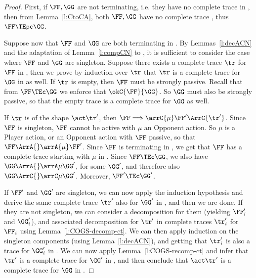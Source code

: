 \begin{proof}
First, if $\FF,\GG$ are not terminating, i.e. they have no complete trace in \AOGS, 
then from Lemma~\ref{l:CtoCA}, both 
$\FF,\GG$ have no complete trace \COGS, thus
$\FF \TEpc \GG$. 

Suppose now that $\FF$ and $\GG$ are both terminating in \AOGS.
By Lemmas~\ref{l:decACN} and the adaptation of Lemma~\ref{l:compCN} to \COGS, it is sufficient to consider 
the case where $\FF$ and $\GG$ are singleton. 
%
Suppose there exists a complete trace $\tr$ for $\FF$ in \COGS, 
then we prove by induction over $\tr$
that $\tr$ is a complete trace for $\GG$ in \COGS as well.
If $\tr$ is empty, then $\FF$ must be strongly passive.
Recall that from $\FF \TEc \GG$ we enforce that
$\okC{\FF}{\GG}$.
So $\GG$ must also be strongly passive, so that 
the empty trace is a complete trace for $\GG$ as well.


If $\tr$ is of the shape $\act\tr'$, then
$\FF \Longrightarrow \arrC {\mu} \FF' \ArrC{\tr'}$.
Since $\FF$ is singleton, $\FF$ cannot be active with $\mu$ an Opponent action.
So $\mu$ is a Player action, or an Opponent action with $\FF$ passive,
so that $\FF \ArrA{}  \arrA {\mu} \FF'$.
Since $\FF$ is terminating in \AOGS, we get that $\FF$ has a complete trace
starting with $\mu$ in \AOGS.
Since 
$\FF  \TEc \GG$, we also have
$\GG \ArrA{} \arrA \mu \GG'$, for some $\GG'$, and therefore also 
$\GG \ArrC{} \arrC \mu \GG'$. 
Moreover, $\FF' \TEc \GG'$.

If $\FF'$ and $\GG'$ are singleton, we can now apply the induction hypothesis 
and derive the same complete trace  $\tr'$ also for $\GG'$ in \COGS, and then we are done. 
%
If they are not singleton, we can consider a decomposition for them 
(yielding $\FF'_i$ and $\GG'_i$), and associated decomposition
for $\tr'$ in complete traces $\tr'_i$ for $\FF_i$ using Lemma~\ref{l:COGS-decomp-ct}. 
We can then apply induction on the singleton components (using
Lemma~\ref{l:decACN}), and getting that
$\tr'_i$ is also a trace for $\GG_i'$ in \COGS. 
We can now apply Lemma~\ref{l:COGS-recomp-ct} 
and infer that $\tr'$ is a complete trace for $\GG'$ in \COGS,
and then conclude that $\act\tr'$ is a complete trace for $\GG$ in \COGS.
\qedhere
\end{proof} 

